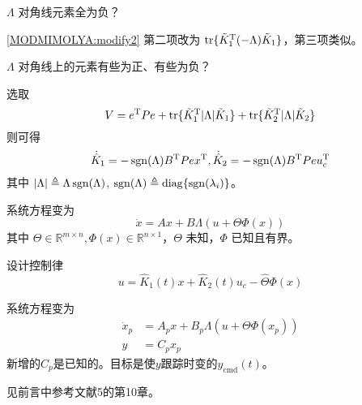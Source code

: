 \begin{problem}
    $\Lambda$ 对角线元素全为负？
\end{problem}
\begin{hint}
\eqref{MODMIMOLYA:modify2} 第二项改为 $\operatorname{tr} \{ \tilde{K}^\mathrm{T}_1 (- \Lambda) \tilde{K} _1 \}$，第三项类似。
\end{hint}
\begin{problem}
    $\Lambda$ 对角线上的元素有些为正、有些为负？
\end{problem}
\begin{hint}
    选取\[ V = e^\mathrm{T} P  e +\operatorname{tr} \{ \tilde{K}^\mathrm{T}_1 |
       \Lambda | \tilde{K} _1 \} +\operatorname{tr} \{
       \tilde{K}^\mathrm{T}_2 | \Lambda | \tilde{K} _2 \} \]
    则可得
    \[ \dot{\hat{K}} _1 = -\operatorname{sgn} (\Lambda) B^\mathrm{T}  P  e
       x^\mathrm{T}, \dot{\hat{K}} _2 = -\operatorname{sgn} (\Lambda) B^\mathrm{T}
       P  e  u^\mathrm{T}_c \]
    其中 $| \Lambda | \triangleq \Lambda \operatorname{sgn}
    (\Lambda)$, $\operatorname{sgn} (\Lambda) \triangleq
    \operatorname{diag} \{ \operatorname{sgn}
    (\lambda_i) \}$。
\end{hint}

\begin{problem}\label{Pro:uncertainty}
系统方程变为
  \begin{equation}
      \dot{x} = A  x + B \Lambda (u + \Theta\Phi (x))\label{Sys:MRAC:MIMO_with_dis}
  \end{equation}
  其中 $\Theta \in \mathbb{R}^{m \times n}, \Phi (x) \in \mathbb{R}^{n \times 1}$，$\Theta$ 未知，$\Phi$ 已知且有界。
\end{problem}
\begin{hint}
    设计控制律\[ u = \hat{K}_1 (t) x + \hat{K}_2 (t) u_c - \hat{\Theta}\Phi (x)  \]
\end{hint}
\begin{problem}
系统方程变为
  \begin{align*}
      \dot{x}_p &= A_p  x + B_p \Lambda (u + \Theta\Phi (x_p))\\
      y&=C_px_p
  \end{align*}
  新增的$C_p$是已知的。目标是使$y$跟踪时变的$y_{\mathrm{cmd}}(t)$。
\end{problem}
\begin{hint}
    见前言中参考文献5的第10章。
\end{hint}
